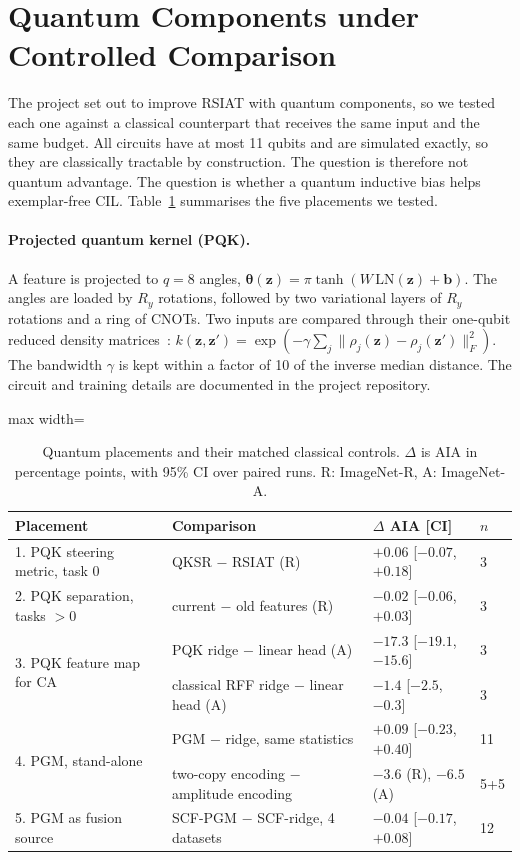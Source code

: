 \section{Quantum Components under Controlled Comparison}
\label{sec:quantum}

The project set out to improve RSIAT with quantum components, so we tested
each one against a classical counterpart that receives the same input and
the same budget. All circuits have at most 11 qubits and are simulated
exactly, so they are classically tractable by construction. The question is
therefore not quantum advantage. The question is whether a quantum
inductive bias helps exemplar-free CIL. Table~\ref{tab:quantum} summarises the five
placements we tested.

\paragraph{Projected quantum kernel (PQK).}
A feature is projected to $q=8$ angles,
$\boldsymbol\theta(\mathbf z)=\pi\tanh(W\,\mathrm{LN}(\mathbf z)+\mathbf b)$. The
angles are loaded by $R_y$ rotations, followed by two variational layers of
$R_y$ rotations and a ring of CNOTs. Two inputs are compared through their
one-qubit reduced density matrices~\cite{huang2021power}:
$k(\mathbf z,\mathbf z')=\exp(-\gamma\sum_j\|\rho_j(\mathbf z)-\rho_j(\mathbf z')\|_F^2)$.
The bandwidth $\gamma$ is kept within a factor of 10 of the inverse median
distance. The circuit and training details are documented in the project repository.

\begin{table}[t]
\centering
\caption{Quantum placements and their matched classical controls. $\Delta$ is
AIA in percentage points, with 95\% CI over paired runs. R: ImageNet-R,
A: ImageNet-A.}
\label{tab:quantum}
\setlength{\tabcolsep}{3pt}
\begin{adjustbox}{max width=\textwidth}
\begin{tabular}{llll}
\toprule
Placement & Comparison & $\Delta$ AIA [CI] & $n$ \\
\midrule
1. PQK steering metric, task 0 & QKSR $-$ RSIAT (R) & $+0.06$ [$-0.07$, $+0.18$] & 3 \\
2. PQK separation, tasks $>0$ & current $-$ old features (R) & $-0.02$ [$-0.06$, $+0.03$] & 3 \\
\multirow{2}{*}{3. PQK feature map for CA} & PQK ridge $-$ linear head (A) & $-17.3$ [$-19.1$, $-15.6$] & 3 \\
 & classical RFF ridge $-$ linear head (A) & $-1.4$ [$-2.5$, $-0.3$] & 3 \\
\multirow{2}{*}{4. PGM, stand-alone} & PGM $-$ ridge, same statistics & $+0.09$ [$-0.23$, $+0.40$] & 11 \\
 & two-copy encoding $-$ amplitude encoding & $-3.6$ (R), $-6.5$ (A) & 5+5 \\
5. PGM as fusion source & SCF-PGM $-$ SCF-ridge, 4 datasets & $-0.04$ [$-0.17$, $+0.08$] & 12 \\
\bottomrule
\end{tabular}
\end{adjustbox}
\end{table}

